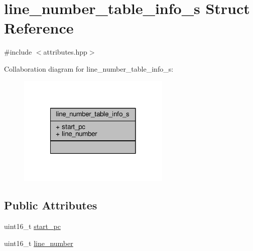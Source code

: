 \hypertarget{structline__number__table__info__s}{\section{line\+\_\+number\+\_\+table\+\_\+info\+\_\+s Struct Reference}
\label{structline__number__table__info__s}
}


{\ttfamily \#include $<$attributes.\+hpp$>$}



Collaboration diagram for line\+\_\+number\+\_\+table\+\_\+info\+\_\+s\+:\nopagebreak
\begin{figure}[H]
\begin{center}
\leavevmode
\includegraphics[width=206pt]{structline__number__table__info__s__coll__graph}
\end{center}
\end{figure}
\subsection*{Public Attributes}
\begin{DoxyCompactItemize}
\item 
uint16\+\_\+t \hyperlink{structline__number__table__info__s_ac18154b426adb423127cd7f09c037424}{start\+\_\+pc}
\item 
uint16\+\_\+t \hyperlink{structline__number__table__info__s_ad953dc84b13bcebcee8b877afc6fdcab}{line\+\_\+number}
\end{DoxyCompactItemize}



